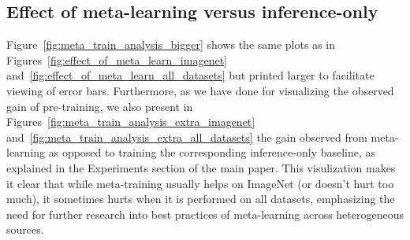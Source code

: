 \documentclass{article} \usepackage{iclr2020_conference,times}
\begin{document}
\subsection{Effect of meta-learning versus inference-only}
Figure~\ref{fig:meta_train_analysis_bigger} shows the same plots as in Figures~\ref{fig:effect_of_meta_learn_imagenet} and~\ref{fig:effect_of_meta_learn_all_datasets} but printed larger to facilitate viewing of error bars.
Furthermore, as we have done for visualizing the observed gain of pre-training, we also present in Figures~\ref{fig:meta_train_analysis_extra_imagenet} and~\ref{fig:meta_train_analysis_extra_all_datasets} the gain observed from meta-learning as opposed to training the corresponding inference-only baseline, as explained in the Experiments section of the main paper. This visulization makes it clear that while meta-training usually helps on ImageNet (or doesn't hurt too much), it sometimes hurts when it is performed on all datasets, emphasizing the need for further research into best practices of meta-learning across heterogeneous sources.
\begin{figure*}[htp]
   \centering
	\hspace{0.01cm}
	\hspace{0.01cm}
   \caption{\label{fig:meta_train_analysis_bigger} Comparing the meta-trained variant of meta-learners against their inference-only counterpart. Same plots as Figure~\ref{fig:effect_of_meta_learn_imagenet} and Figure~\ref{fig:effect_of_meta_learn_all_datasets}, only larger.}
 \end{figure*}

\begin{figure*}[htp]
   \centering
{}\hspace{0.01cm}
\hspace{0.01cm}
   \caption{\label{fig:meta_train_analysis_extra} The performance difference of meta-learning over the corresponding inference-only baseline of each meta-learner. Positive values indicate that meta-learning was beneficial.}
 \end{figure*}
\end{document}
